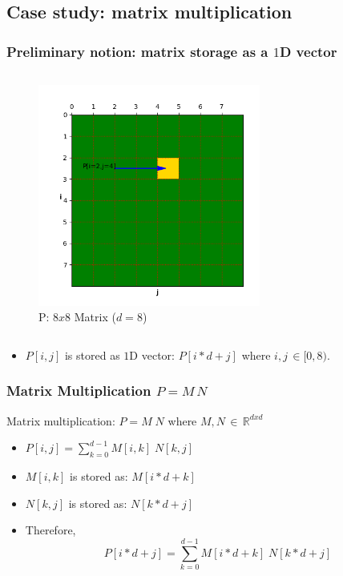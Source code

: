 \subsection{Case study: matrix multiplication}
\begin{frame}
   \frametitle{Preliminary notion: matrix storage as a $1$D vector}
     \begin{columns}
           \begin{figure}[H]
              \centering
              \includegraphics[width=0.65\textwidth]{./img/matrix8x8.png}
		   \caption{\small{P: $8x8$ Matrix ($d=8$)}}
           \end{figure}
     \end{columns}
     \begin{itemize}
	     \item $P[i,j]$ is stored as $1$D vector: $P[i*d+j]$ where $i,j\,\in [0,8)$.
     \end{itemize}		     
\end{frame}


\begin{frame}
   \frametitle{Matrix Multiplication $P=M\,N$}
      Matrix multiplication: $P=M \; N$ where $M,N \, \in \, \mathbb{R}^{dxd}$  
      \begin{itemize}
	   \item $P[i,j] = \displaystyle \sum_{k=0}^{d-1} M[i,k]\;N[k,j]$ 
  	   \item $M[i,k]$ is stored as: $M[i*d+k]$
 	   \item $N[k,j]$ is stored as: $N[k*d+j]$ 		      
           \item Therefore,
	      \begin{equation}  
		      P[i*d+j] =  \sum_{k=0}^{d-1} M[i*d+k]\;N[k*d+j] \label{Eq:MatMul}
              \end{equation}			  
      \end{itemize}		      
\end{frame}	


